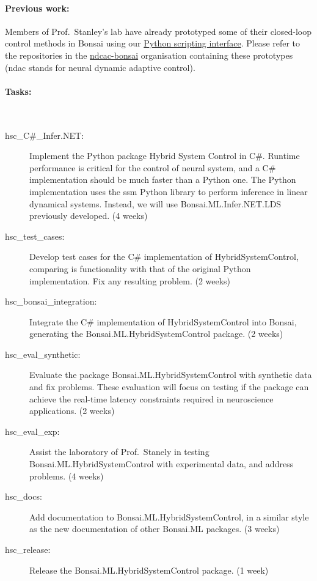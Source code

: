 \paragraph{Previous work:} Members of Prof.~Stanley’s lab have already
prototyped some of their closed-loop control methods in Bonsai using our
\href{https://bonsai-rx.org/python-scripting/}{Python scripting interface}.
Please refer to the repositories in the
\href{https://github.com/ndac-bonsai}{ndcac-bonsai} organisation containing
these prototypes (ndac stands for neural dynamic adaptive control).

\paragraph{Tasks:}\mbox{}\\

\begin{description}

    \item[hsc\_C\#\_Infer.NET:] Implement the Python package Hybrid System
        Control in C\#.
        Runtime performance is critical for the control of neural system, and a
        C\# implementation should be much faster than a Python one.
        The Python implementation uses the ssm Python library to perform
        inference in linear dynamical systems. Instead, we will
        use Bonsai.ML.Infer.NET.LDS previously developed. (4 weeks)

    \item[hsc\_test\_cases:] Develop test cases for the C\# implementation of
        HybridSystemControl, comparing is functionality with that of the
        original Python implementation. Fix any resulting problem. (2 weeks)

    \item[hsc\_bonsai\_integration:] Integrate the C\# implementation of HybridSystemControl
        into Bonsai, generating the Bonsai.ML.HybridSystemControl package.  (2
        weeks)

    \item[hsc\_eval\_synthetic:] Evaluate the package
        Bonsai.ML.HybridSystemControl with synthetic data and fix problems.
        These evaluation will focus on testing if the package can achieve the
        real-time latency constraints required in neuroscience applications. (2
        weeks)

    \item[hsc\_eval\_exp:] Assist the laboratory of Prof.~Stanely in
        testing Bonsai.ML.HybridSystemControl with experimental data, and
        address problems. (4 weeks)

    \item[hsc\_docs:] Add documentation to Bonsai.ML.HybridSystemControl, in a
        similar style as the new documentation of other Bonsai.ML packages. (3
        weeks)

    \item[hsc\_release:] Release the Bonsai.ML.HybridSystemControl package. (1
        week)

\end{description}

